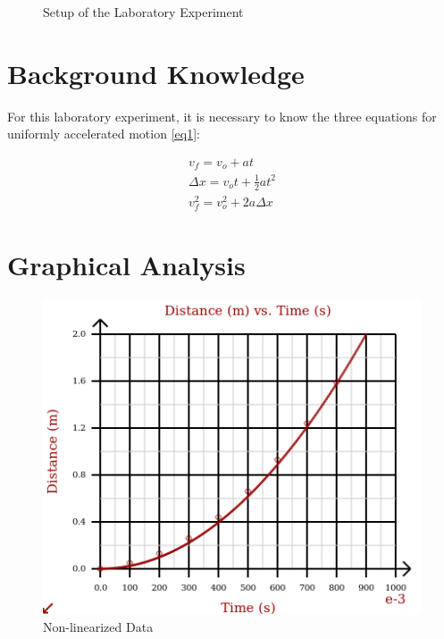 \documentclass{article}
\begin{document}
\begin{figure}[H]
  \centering
  
  \caption{Setup of the Laboratory Experiment}
  \label{fig:diag}
\end{figure}

\section{Background Knowledge}

\begin{justify}

  For this laboratory experiment, it is necessary to know the three equations for uniformly accelerated motion \eqref{eq1}:

\end{justify}

\begin{equation}
  \begin{split}
    v_f=v_o+at \\
    \Delta x=v_ot+\frac{1}{2}at^2 \\
    v_f^2=v_o^2+2a\Delta x
  \end{split}
  \label{eq1}
\end{equation}

\section{Graphical Analysis}

\begin{figure}[H]
  \centering
  \includegraphics[width=.7\textwidth]{Figures/Curved.png}
  \caption{Non-linearized Data}
  \label{fig:curve}
\end{figure}
\end{document}
